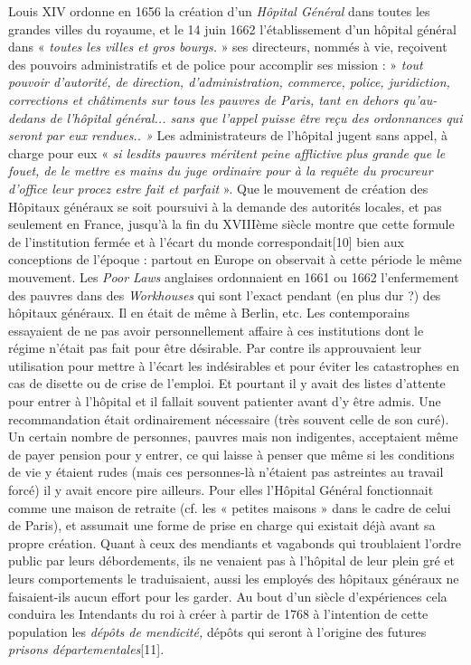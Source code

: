  Louis XIV ordonne en 1656 la création d'un \emph{Hôpital Général} dans toutes les grandes villes du royaume, et le 14 juin 1662 l'établissement d'un hôpital général dans « \emph{toutes les villes et gros bourgs.} » ses directeurs, nommés à vie, reçoivent des pouvoirs administratifs et de police pour accomplir ses mission : » \emph{tout pouvoir d'autorité, de direction, d'administration, commerce, police, juridiction, corrections et châtiments sur tous les pauvres de Paris, tant en dehors qu'au-dedans de l'hôpital général... sans que l'appel puisse être reçu des ordonnances qui seront par eux rendues.. »} Les administrateurs de l'hôpital jugent sans appel, à charge pour eux « \emph{ si lesdits pauvres méritent peine afflictive plus grande que le fouet, de le mettre es mains du juge ordinaire pour à la requête du procureur d'office leur procez estre fait et parfait} ». 
 Que le mouvement de création des Hôpitaux généraux se soit poursuivi à la demande des autorités locales, et pas seulement en France, jusqu'à la fin du XVIIIème siècle montre que cette formule de l'institution fermée et à l'écart du monde correspondait[10] bien aux conceptions de l'époque : partout en Europe on observait à cette période le même mouvement. Les \emph{Poor Laws} anglaises ordonnaient en 1661 ou 1662 l'enfermement des pauvres dans des \emph{Workhouses} qui sont l'exact pendant (en plus dur ?) des hôpitaux généraux. Il en était de même à Berlin, etc. 
 Les contemporains essayaient de ne pas avoir personnellement affaire à ces institutions dont le régime n'était pas fait pour être désirable. Par contre ils approuvaient leur utilisation pour mettre à l'écart les indésirables et pour éviter les catastrophes en cas de disette ou de crise de l'emploi. 
 Et pourtant il y avait des listes d'attente pour entrer à l'hôpital et il fallait souvent patienter avant d'y être admis. Une recommandation était ordinairement nécessaire (très souvent celle de son curé). Un certain nombre de personnes, pauvres mais non indigentes, acceptaient même de payer pension pour y entrer, ce qui laisse à penser que même si les conditions de vie y étaient rudes (mais ces personnes-là n'étaient pas astreintes au travail forcé) il y avait encore pire ailleurs. Pour elles l'Hôpital Général fonctionnait comme une maison de retraite (cf. les « petites maisons » dans le cadre de celui de Paris), et assumait une forme de prise en charge qui existait déjà avant sa propre création.
 Quant à ceux des mendiants et vagabonds qui troublaient l'ordre public par leurs débordements, ils ne venaient pas à l'hôpital de leur plein gré et leurs comportements le traduisaient, aussi les employés des hôpitaux généraux ne faisaient-ils aucun effort pour les garder. Au bout d'un siècle d'expériences cela conduira les Intendants du roi à créer à partir de 1768 à l'intention de cette population les \emph{dépôts de mendicité,} dépôts qui seront à l'origine des futures \emph{prisons départementales}[11].
